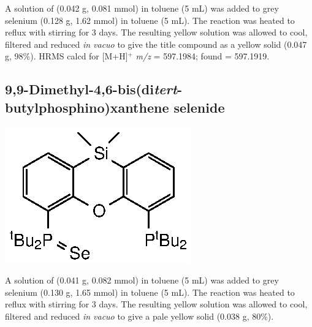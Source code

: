 A solution of \tButhixantphos{} (0.042 g, 0.081 mmol) in toluene (5 mL) was added to grey selenium (0.128 g, 1.62 mmol) in toluene (5 mL).  The reaction was heated to reflux with stirring for 3 days.  The resulting yellow solution was allowed to cool, filtered and reduced \emph{in vacuo} to give the title compound as a yellow solid (0.047 g, 98\%).   
HRMS calcd for  [M+H]$^+$ \emph{m/z} = 597.1984; found = 597.1919.


\subsection*{9,9-Dimethyl-4,6-bis(di\emph{tert}-butylphosphino)xanthene selenide}
\begin{structure}[h]
\begin{center}
\includegraphics{../Structures/CtBuSe.eps}
\end{center}
\end{structure}

A solution of \tBuxantphos{} (0.041 g, 0.082 mmol) in toluene (5 mL) was added to grey selenium (0.130 g, 1.65 mmol) in toluene (5 mL).  The reaction was heated to reflux with stirring for 3 days.  The resulting yellow solution was allowed to cool, filtered and reduced \emph{in vacuo} to give a pale yellow solid (0.038 g, 80\%).    

